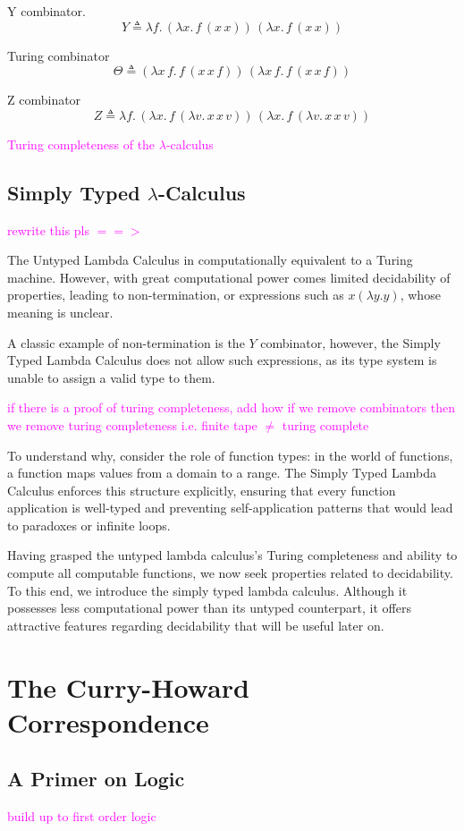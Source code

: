 \documentclass[12pt]{book}
\newcommand{\la}{\lambda}
\newcommand{\lCalc}{$\la$-Calculus}
\newcommand{\lcalc}{$\la$-calculus}
\newcommand{\magenta}[1]{\textcolor{magenta}{#1}}
\theoremstyle{plain}
\theoremstyle{definition}
\theoremstyle{definition}
\theoremstyle{definition}
\begin{document}
Y combinator.
\[
Y \triangleq \lambda f.\, (\lambda x.\, f\, (x\, x))\, (\lambda x.\, f\, (x\, x))
\]

Turing combinator
\[
\Theta \triangleq 
(\lambda x\, f.\, f\, (x\, x\, f))\, (\lambda x\, f.\, f\, (x\, x\, f))
\]

Z combinator
\[
Z \triangleq \lambda f.\, 
  (\lambda x.\, f\, (\lambda v.\, x\, x\, v))\, 
  (\lambda x.\, f\, (\lambda v.\, x\, x\, v))
\]

\magenta{Turing completeness of the \lcalc} 


\section{\centering Simply Typed \lCalc}


\magenta{rewrite this pls $==>$}

The Untyped Lambda Calculus in computationally equivalent to a  Turing machine. However, with great computational power comes limited decidability of properties, leading to non-termination, or expressions such as $x(\lambda y . y)$, whose meaning is unclear.

A classic example of non-termination is the $Y$ combinator, however, the Simply Typed Lambda Calculus does not allow such expressions, as its type system is unable to assign a valid type to them.

\magenta{if there is a proof of turing completeness, add how if we remove combinators then we remove turing completeness i.e. finite tape $\neq$ turing complete}

To understand why, consider the role of function types: in the world of functions, a function maps values from a domain to a range. The Simply Typed Lambda Calculus enforces this structure explicitly, ensuring that every function application is well-typed and preventing self-application patterns that would lead to paradoxes or infinite loops.

Having grasped the untyped lambda calculus's Turing completeness and ability to compute all computable functions, we now seek properties related to decidability. To this end, we introduce the simply typed lambda calculus. Although it possesses less computational power than its untyped counterpart, it offers attractive features regarding decidability that will be useful later on.


\chapter{The Curry-Howard Correspondence}


\section*{\centering A Primer on Logic}
\magenta{build up to first order logic}
\end{document}
